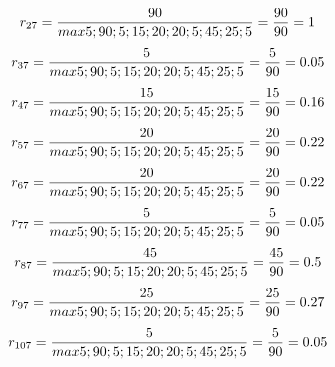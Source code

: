 \begin{enumerate}
\begin{displaymath}
r_{27} = \frac{90}{max {5;90;5;15;20;20;5;45;25;5}} = \frac{90}{90} = 1\\
\end{displaymath}
\begin{displaymath}
r_{37} = \frac{5}{max {5;90;5;15;20;20;5;45;25;5}} = \frac{5}{90} = 0.05\\
\end {displaymath}
\begin{displaymath}
r_{47} = \frac{15}{max {5;90;5;15;20;20;5;45;25;5}} = \frac{15}{90} = 0.16\\
\end {displaymath}
\begin{displaymath}
r_{57} = \frac{20}{max {5;90;5;15;20;20;5;45;25;5}} = \frac{20}{90} = 0.22\\
\end {displaymath}
\begin{displaymath}
r_{67} = \frac{20}{max {5;90;5;15;20;20;5;45;25;5}} = \frac{20}{90} = 0.22\\
\end {displaymath}
\begin{displaymath}
r_{77} = \frac{5}{max {5;90;5;15;20;20;5;45;25;5}} = \frac{5}{90} = 0.05\\
\end {displaymath}
\begin{displaymath}
r_{87} = \frac{45}{max {5;90;5;15;20;20;5;45;25;5}} = \frac{45}{90} = 0.5\\
\end {displaymath}
\begin{displaymath}
r_{97} = \frac{25}{max {5;90;5;15;20;20;5;45;25;5}} = \frac{25}{90} = 0.27\\
\end {displaymath}
\begin{displaymath}
r_{107} = \frac{5}{max {5;90;5;15;20;20;5;45;25;5}} = \frac{5}{90} = 0.05\\
\end {displaymath}
\end{enumerate}

